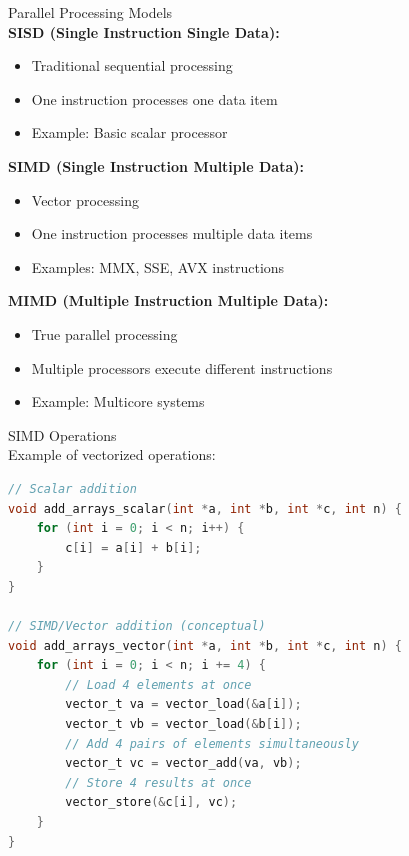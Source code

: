 \begin{concept}{Parallel Processing Models}\\
\textbf{SISD (Single Instruction Single Data):}
\begin{itemize}
  \item Traditional sequential processing
  \item One instruction processes one data item
  \item Example: Basic scalar processor
\end{itemize}

\textbf{SIMD (Single Instruction Multiple Data):}
\begin{itemize}
  \item Vector processing
  \item One instruction processes multiple data items
  \item Examples: MMX, SSE, AVX instructions
\end{itemize}

\textbf{MIMD (Multiple Instruction Multiple Data):}
\begin{itemize}
  \item True parallel processing
  \item Multiple processors execute different instructions
  \item Example: Multicore systems
\end{itemize}
\end{concept}



\begin{example2}{SIMD Operations}\\
Example of vectorized operations:

\begin{lstlisting}[language=C, style=basesmol]
// Scalar addition
void add_arrays_scalar(int *a, int *b, int *c, int n) {
    for (int i = 0; i < n; i++) {
        c[i] = a[i] + b[i];
    }
}

// SIMD/Vector addition (conceptual)
void add_arrays_vector(int *a, int *b, int *c, int n) {
    for (int i = 0; i < n; i += 4) {
        // Load 4 elements at once
        vector_t va = vector_load(&a[i]);
        vector_t vb = vector_load(&b[i]);
        // Add 4 pairs of elements simultaneously
        vector_t vc = vector_add(va, vb);
        // Store 4 results at once
        vector_store(&c[i], vc);
    }
}
\end{lstlisting}
\end{example2}

